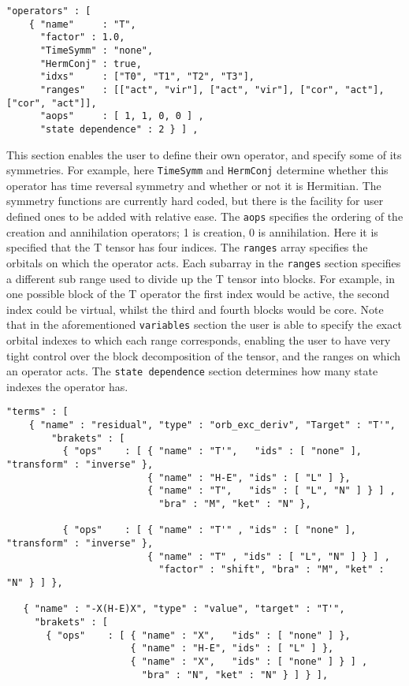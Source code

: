 \begin{lstlisting}[label={lst:operators}]
  "operators" : [
    { "name"     : "T",
      "factor" : 1.0,
      "TimeSymm" : "none",
      "HermConj" : true,
      "idxs"     : ["T0", "T1", "T2", "T3"],
      "ranges"   : [["act", "vir"], ["act", "vir"], ["cor", "act"], ["cor", "act"]],
      "aops"     : [ 1, 1, 0, 0 ] ,
      "state dependence" : 2 } ] ,
\end{lstlisting}         
\noindent This section enables the user to define their own operator, and
specify some of its symmetries. For example, here \texttt{TimeSymm} and
\texttt{HermConj} determine whether this operator has time reversal symmetry 
and whether or not it is Hermitian. The symmetry functions are 
currently hard coded, but there is the facility for user defined ones
to be added with relative ease.
 The \texttt{aops} specifies the ordering of the   
creation and annihilation operators; 1 is creation, 0 is annihilation.  Here it
is specified that the T tensor has four indices. The \texttt{ranges} array specifies the
orbitals on which the operator acts.  Each subarray in the \texttt{ranges} section
specifies a different sub range used to divide up the T tensor into blocks.
For example, in one possible block of the T operator the first index would be
active, the second index could be virtual, whilst the third and fourth blocks
would be core.  Note that in the aforementioned \texttt{variables} section the user is
able to specify the exact orbital indexes to which each range corresponds,
enabling the user to have very tight control over the block decomposition of
the tensor, and the ranges on which an operator acts. 
The \texttt{state dependence} section determines how many state indexes 
the operator has.
\begin{lstlisting}[label={lst:terms}]
  "terms" : [
    { "name" : "residual", "type" : "orb_exc_deriv", "Target" : "T'",
        "brakets" : [
          { "ops"    : [ { "name" : "T'",   "ids" : [ "none" ], "transform" : "inverse" },
                         { "name" : "H-E", "ids" : [ "L" ] },
                         { "name" : "T",   "ids" : [ "L", "N" ] } ] ,
                           "bra" : "M", "ket" : "N" }, 

          { "ops"    : [ { "name" : "T'" , "ids" : [ "none" ], "transform" : "inverse" },
                         { "name" : "T" , "ids" : [ "L", "N" ] } ] ,
                           "factor" : "shift", "bra" : "M", "ket" : "N" } ] },

   { "name" : "-X(H-E)X", "type" : "value", "target" : "T'",
     "brakets" : [
       { "ops"    : [ { "name" : "X",   "ids" : [ "none" ] },
                      { "name" : "H-E", "ids" : [ "L" ] },
                      { "name" : "X",   "ids" : [ "none" ] } ] ,
                        "bra" : "N", "ket" : "N" } ] } ],
\end{lstlisting}         
